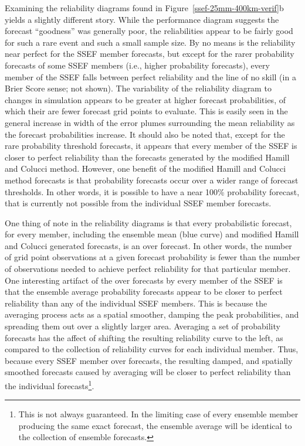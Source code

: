 Examining the reliability diagrams found in \mbox{Figure \ref{ssef-25mm-400km-verif}b} yields a slightly different story.
While the performance diagram suggests the forecast ``goodness'' was generally poor, the reliabilities appear to be fairly good for such a rare event and such a small sample size.
By no means is the reliability near perfect for the SSEF member forecasts, but except for the rarer probability forecasts of some SSEF members (i.e., higher probability forecasts), every member of the SSEF falls between perfect reliability and the line of no skill (in a Brier Score sense; not shown).
The variability of the reliability diagram to changes in simulation appears to be greater at higher forecast probabilities, of which their are fewer forecast grid points to evaluate.
This is easily seen in the general increase in width of the error plumes surrounding the mean reliability as the forecast probabilities increase.
It should also be noted that, except for the rare probability threshold forecasts, it appears that every member of the SSEF is closer to perfect reliability than the forecasts generated by the modified Hamill and Colucci method.
However, one benefit of the modified Hamill and Colucci method forecasts is that probability forecasts occur over a wider range of forecast thresholds.
In other words, it is possible to have a near 100\% probability forecast, that is currently not possible from the individual SSEF member forecasts.


One thing of note in the reliability diagrams is that every probabilistic forecast, for every member, including the ensemble mean (blue curve) and modified Hamill and Colucci generated forecasts, is an over forecast.
In other words, the number of grid point observations at a given forecast probability is fewer than the number of observations needed to achieve perfect reliability for that particular member.
One interesting artifact of the over forecasts by every member of the SSEF is that the ensemble average probability forecasts appear to be closer to perfect reliability than any of the individual SSEF members.
This is because the averaging process acts as a spatial smoother, damping the peak probabilities, and spreading them out over a slightly larger area.
Averaging a set of probability forecasts has the affect of shifting the resulting reliability curve to the left, as compared to the collection of reliability curves for each individual member.
Thus, because every SSEF member over forecasts, the resulting damped, and spatially smoothed forecasts caused by averaging will be closer to perfect reliability than the individual forecasts\footnote{This is not always guaranteed. In the limiting case of every ensemble member producing the same exact forecast, the ensemble average will be identical to the collection of ensemble forecasts.}.




